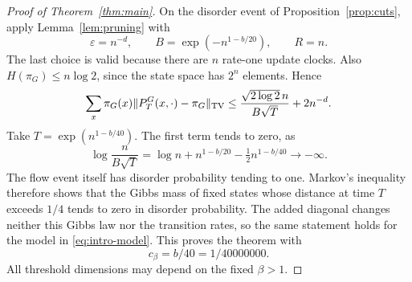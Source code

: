 \begin{proof}[Proof of Theorem~\ref{thm:main}]
On the disorder event of Proposition~\ref{prop:cuts}, apply
Lemma~\ref{lem:pruning} with
\[
 \varepsilon=n^{-d},\qquad B=\exp(-n^{1-b/20}),\qquad R=n.
\]
The last choice is valid because there are $n$ rate-one update
clocks. Also $H(\pi_G)\le n\log2$, since the state space has
$2^n$ elements. Hence
\[
 \sum_x\pi_G(x)\|P_T^G(x,\cdot)-\pi_G\|_{\rm TV}
 \le\frac{\sqrt{2\log2}\,n}{B\sqrt T}+2n^{-d}.
\]
Take $T=\exp(n^{1-b/40})$. The first term tends to zero, as
\[
 \log\frac{n}{B\sqrt T}
 =\log n+n^{1-b/20}-\tfrac12n^{1-b/40}\longrightarrow-\infty.
\]
The flow event itself has disorder probability tending to one.
Markov's inequality therefore shows that the Gibbs mass of fixed
states whose distance at time $T$ exceeds $1/4$ tends to zero in
disorder probability. The added diagonal changes neither this Gibbs
law nor the transition rates, so the same statement holds for the
model in \eqref{eq:intro-model}. This proves the theorem with
\[
 c_\beta=b/40=1/40000000.
\]
All threshold dimensions may depend on the fixed $\beta>1$.
\end{proof}
